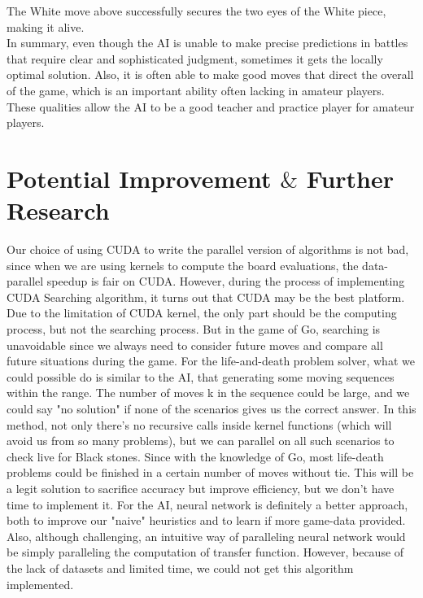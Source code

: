 \documentclass[11pt]{article}
\begin{document}
The White move above successfully secures the two eyes of the White piece, making it alive. \\
In summary, even though the AI is unable to make precise predictions in battles that require clear and sophisticated judgment, sometimes it gets the locally optimal solution. Also, it is often able to make good moves that direct the overall of the game, which is an important ability often lacking in amateur players. These qualities allow the AI to be a good teacher and practice player for amateur players. 

\newpage
\section*{Potential Improvement $\&$ Further Research} 

Our choice of using CUDA to write the parallel version of algorithms is not bad, since when we are using kernels to compute the board evaluations, the data-parallel speedup is fair on CUDA. However, during the process of implementing CUDA Searching algorithm, it turns out that CUDA may be the best platform. Due to the limitation of CUDA kernel, the only part should be the computing process, but not the searching process. But in the game of Go, searching is unavoidable since we always need to consider future moves and compare all future situations during the game. \newline
For the life-and-death problem solver, what we could possible do is similar to the AI, that generating some moving sequences within the range. The number of moves k in the sequence could be large, and we could say "no solution" if none of the scenarios gives us the correct answer. In this method, not only there's no recursive calls inside kernel functions (which will avoid us from so many problems), but we can parallel on all such scenarios to check live for Black stones. Since with the knowledge of Go, most life-death problems could be finished in a certain number of moves without tie. This will be a legit solution to sacrifice accuracy but improve efficiency, but we don't have time to implement it. \newline
For the AI, neural network is definitely a better approach, both to improve our "naive" heuristics and to learn if more game-data provided. Also, although challenging, an intuitive way of paralleling neural network would be simply paralleling the computation of transfer function.
However, because of the lack of datasets and limited time, we could not get this algorithm implemented.
\end{document}
